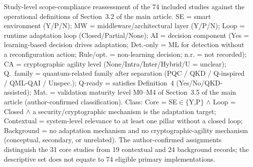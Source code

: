 Study-level scope-compliance reassessment of the 74 included studies against the operational definitions of Section~3.2 of the main article. SE = smart environment (Y/P/N); MW = middleware/architectural layer (Y/P/N); Loop = runtime adaptation loop (Closed/Partial/None); AI = decision component (Yes = learning-based decision drives adaptation; Det.-only = ML for detection without a reconfiguration action; Rule/opt. = non-learning decision; n.r. = not recorded); CA = cryptographic agility level (None/Intra/Inter/Hybrid/U = unclear); Q.~family = quantum-related family after separation (PQC / QKD / Q-inspired / QML-QAI / Unspec.); Q-ready = satisfies Definition~4 (Yes/No/QKD-assisted); Mat. = validation maturity level M0--M4 of Section~3.5 of the main article (author-confirmed classification). Class: Core = SE$\in\{$Y,P$\}$ $\wedge$ Loop = Closed $\wedge$ a security/cryptographic mechanism is the adaptation target; Contextual = system-level relevance to at least one pillar without a closed loop; Background = no adaptation mechanism and no cryptographic-agility mechanism (conceptual, secondary, or unrelated). The author-confirmed assignments distinguish the 31 core studies from 19 contextual and 24 background records; the descriptive set does not equate to 74 eligible primary implementations.

